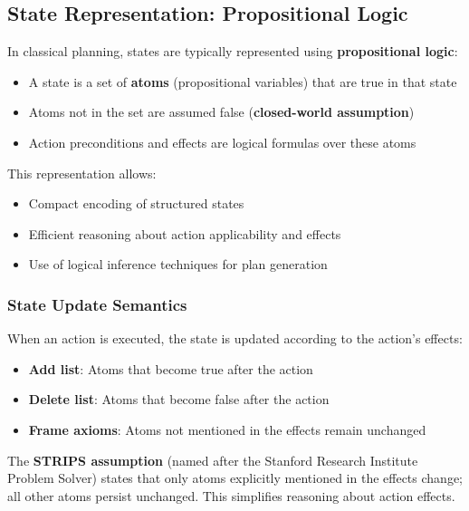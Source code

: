\documentclass[11pt,a4paper]{article}
\theoremstyle{definition}
\theoremstyle{plain}
\theoremstyle{remark}
\begin{document}
\subsection{State Representation: Propositional Logic}

In classical planning, states are typically represented using \textbf{propositional logic}:

\begin{itemize}
    \item A state is a set of \textbf{atoms} (propositional variables) that are true in that state
    \item Atoms not in the set are assumed false (\textbf{closed-world assumption})
    \item Action preconditions and effects are logical formulas over these atoms
\end{itemize}

This representation allows:
\begin{itemize}
    \item Compact encoding of structured states
    \item Efficient reasoning about action applicability and effects
    \item Use of logical inference techniques for plan generation
\end{itemize}

\subsubsection{State Update Semantics}

\begin{tcolorbox}[colback=yellow!10!white,colframe=yellow!75!black,title=\textbf{STRIPS Assumption}]
When an action is executed, the state is updated according to the action's effects:
\begin{itemize}
    \item \textbf{Add list}: Atoms that become true after the action
    \item \textbf{Delete list}: Atoms that become false after the action
    \item \textbf{Frame axioms}: Atoms not mentioned in the effects remain unchanged
\end{itemize}

The \textbf{STRIPS assumption} (named after the Stanford Research Institute Problem Solver) states that only atoms explicitly mentioned in the effects change; all other atoms persist unchanged. This simplifies reasoning about action effects.
\end{tcolorbox}
\end{document}
